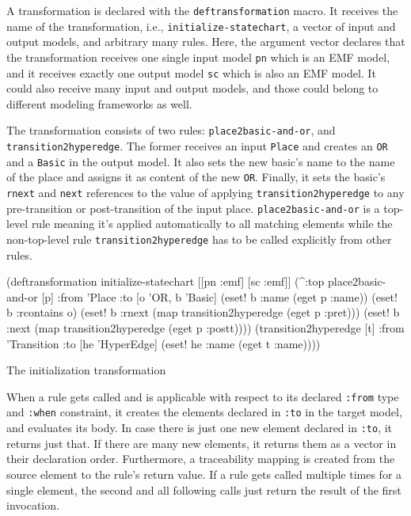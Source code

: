 \documentclass[submission]{eptcs}
\begin{document}
A transformation is declared with the \verb|deftransformation| macro.  It
receives the name of the transformation, i.e., \verb|initialize-statechart|, a
vector of input and output models, and arbitrary many rules.  Here, the
argument vector declares that the transformation receives one single input
model \verb|pn| which is an EMF model, and it receives exactly one output model
\verb|sc| which is also an EMF model.  It could also receive many input and
output models, and those could belong to different modeling frameworks as well.

The transformation consists of two rules: \verb|place2basic-and-or|, and
\verb|transition2hyperedge|.  The former receives an input \verb|Place| and
creates an \verb|OR| and a \verb|Basic| in the output model.  It also sets the
new basic's name to the name of the place and assigns it as content of the new
\verb|OR|.  Finally, it sets the basic's \verb|rnext| and \verb|next|
references to the value of applying \verb|transition2hyperedge| to any
pre-transition or post-transition of the input place.
\verb|place2basic-and-or| is a top-level rule meaning it's applied
automatically to all matching elements while the non-top-level rule
\verb|transition2hyperedge| has to be called explicitly from other rules.

\begin{listing}[H]
  \begin{clojurecode}
(deftransformation initialize-statechart [[pn :emf] [sc :emf]]
  (^:top place2basic-and-or [p]
         :from 'Place
         :to [o 'OR, b 'Basic]
         (eset! b :name (eget p :name))
         (eset! b :rcontains o)
         (eset! b :rnext (map transition2hyperedge
                              (eget p :pret)))
         (eset! b :next  (map transition2hyperedge
                              (eget p :postt))))
  (transition2hyperedge [t]
         :from 'Transition
         :to [he 'HyperEdge]
         (eset! he :name (eget t :name))))
  \end{clojurecode}
  \label{lst:init}
  \caption{The initialization transformation}
\end{listing}

When a rule gets called and is applicable with respect to its declared
\verb|:from| type and \verb|:when| constraint, it creates the elements declared
in \verb|:to| in the target model, and evaluates its body.  In case there is
just one new element declared in \verb|:to|, it returns just that.  If there
are many new elements, it returns them as a vector in their declaration order.
Furthermore, a traceability mapping is created from the source element to the
rule's return value.  If a rule gets called multiple times for a single
element, the second and all following calls just return the result of the first
invocation.
\end{document}
